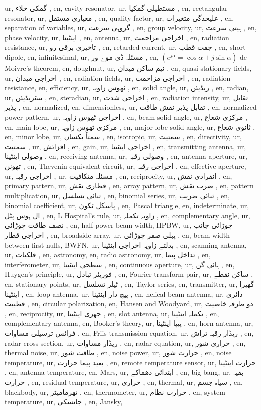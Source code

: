 ur, گمکی خلاء ,
en, cavity resonator,
ur, مستطیلی گمکیا ,
en, rectangular resonator,
ur, معیاری مستقل ,
en, quality factor,
ur, علیحدگی متغیرات ,
en, separation of variables,
ur, گروہی سرعت ,
en, group velocity,
ur, ہیتی سرعت ,
en, phase velocity,
ur, اینٹینا ,
en, antenna,
ur, اخراجی مزاحمت ,
en, radiation resistance,
ur, تاخیری برقی رو ,
en, retarded current,
ur,  جفت قطب ,
en, short dipole,
en, infinitesimal,
ur, مسئلہ ڈی موے ور ,
en, $(e^{j\alpha }=\cos \alpha + j \sin \alpha )$ de Moivre's theorem,
en, doughnut,
ur, نیم ساکن میدان ,
en, quasi stationary fields,
ur, اخراجی میدان ,
en, radiation fields,
ur, اخراجی مزاحمت ,
en, radiation resistance,
en, efficiency,
ur, ٹھوس زاویہ ,
en, solid angle,
ur, ریڈیئن ,
en, radian,
ur, سٹریڈیئن ,
en, steradian,
ur, اخراجی شدت ,
en, radiation intensity,
ur, تقابل پذیر ,
en, normalized,
en, dimensionless,
ur, تقابل پذیر نقش طاقت ,
en, normalized power pattern,
ur, اخراجی ٹھوس زاویہ ,
en, beam solid angle,
ur, مرکزی شعاع ,
en, main lobe,
ur, مرکزی ٹھوس زاویہ ,
en, major lobe solid angle,
ur, ثانوی شعاع ,
en, minor lobe,
ur, سمتاً یکساں ,
en, isotropic,
ur, سمتیت ,
en, directivity,
ur, سمتیت ,
ur, افزائش ,
en, gain,
ur, اخراجی اینٹینا ,
en, transmitting antenna,
ur, وصولی اینٹینا ,
en, receiving antenna,
ur, وصولی رقبہ ,
en, antenna aperture,
ur, تھونن ,
en, Thevenin equivalent circuit,
ur, اخراجی رقبہ ,
en, effective aperture,
ur, اخراجی رقبہ ,
ur, مسئلہ متکافیت ,
en, reciprocity,
ur, انفرادی نقش ,
en, primary pattern,
ur, قطاری نقش ,
en, array pattern,
ur, ضرب نقش ,
en, pattern multiplication,
ur, ثنائی تسلسل ,
en, binomial series,
ur, ثنائی ضریب ,
en, binomial coefficient,
ur, پاسکل تکون ,
en, Pascal triangle,
en, indeterminate,
ur, ال ہوس پٹل ,
en, L Hospital's rule,
ur, زاویہ تکملہ ,
en, complementary angle,
ur, نصف طاقت چوڑائی ,
en, half power beam width, HPBW,
ur, چوڑائی جانب اخراجی قطار ,
en, broadside array,
ur, پہلی صفر چوڑائی ,
en, beam width between first nulls, BWFN,
ur, بدلتے زاویہ اخراجی اینٹینا ,
en, scanning antenna,
ur, فلکیات ,
en, astronomy,
en, radio astronomy,
ur, تداخل پیما ,
en, interferometer,
ur, سطحی اینٹینا ,
en, continuous aperture,
ur, ہائی گن ,
en, Huygen's principle,
ur, فوریئر تبادل ,
en, Fourier transform pair,
ur, ساکن نقطے ,
en, stationary points,
ur, ٹیلر تسلسل ,
en, Taylor series,
en, transmitter,
ur, گھیرا اینٹینا ,
en, loop antenna,
ur, پیچ دار اینٹینا ,
en, helical-beam antenna,
ur, دائری قطبیت ,
en, circular polarization,
en, Hansen and Woodyard,
ur, دو طرفہ خاصیت ,
en, reciprocity,
ur, جھری اینٹینا ,
en, slot antenna,
ur, تکملہ اینٹینا ,
en, complementary antenna,
en, Booker's theory,
ur, پیپا اینٹینا ,
en, horn antenna,
ur, فرائس ترسیلی مساوات ,
en, Friis transmission equation,
ur, ریڈار رقبہ تراش ,
en, radar cross section,
ur, ریڈار مساوات ,
en, radar equation,
ur, حراری شور ,
en, thermal noise,
ur, طاقت شور ,
en, noise power,
ur, حرارت شور ,
en, noise temperature,
ur, بعید پیما حرارت ,
en, remote temperature sensor,
ur, حرارت اینٹینا ,
en, antenna temperature,
en, Mars,
ur, ابتدائی دھماکے ,
en, big bang,
ur, بقیہ حرارت ,
en, residual temperature,
ur, حراری ,
en, thermal,
ur, سیاہ جسم ,
en, blackbody,
ur, تھرمامیٹر ,
en, thermometer,
ur, حرارت نظام ,
en, system temperature,
ur, جانسکی ,
en, Jansky,
